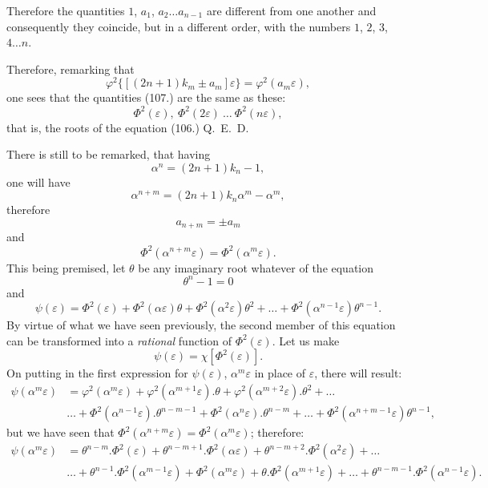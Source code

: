 \documentclass{article}
\begin{document}
Therefore the quantities $1$, $a_{1}$, $a_{2}\ldots a_{n-1}$ are different from one another and consequently they coincide, but in a different order, with the numbers $1$, $2$, $3$, $4\ldots n$.

Therefore, remarking that
\[ \varphi^{2}\{[(2n+1)k_{m}\pm a_{m}]\varepsilon\}=\varphi^{2}(a_{m}\varepsilon), \]
one sees that the quantities (107.) are the same as these:
\[ \Phi^{2}(\varepsilon),\ \Phi^{2}(2\varepsilon)\ \ldots\ \Phi^{2}(n\varepsilon), \]
that is, the roots of the equation (106.) Q.\ E.\ D.

There is still to be remarked, that having
\[ \alpha^{n}=(2n+1)k_{n}-1, \]
one will have
\[ \alpha^{n+m}=(2n+1)k_{n}\alpha^{m}-\alpha^{m}, \]
therefore
\[ a_{n+m}=\pm a_{m} \]
and
\[ \Phi^{2}(\alpha^{n+m}\varepsilon)=\Phi^{2}(\alpha^{m}\varepsilon). \]
This being premised, let $\theta$ be any imaginary root whatever of the equation
\[ \theta^{n}-1=0 \]
and
\[ \psi(\varepsilon)=\Phi^{2}(\varepsilon)+\Phi^{2}(\alpha\varepsilon)\theta+\Phi^{2}(\alpha^{2}\varepsilon)\theta^{2}+\ldots+\Phi^{2}(\alpha^{n-1}\varepsilon)\theta^{n-1}. \tag{108.} \]
By virtue of what we have seen previously, the second member of this equation can be transformed into a \emph{rational} function of $\Phi^{2}(\varepsilon)$. Let us make
\[ \psi(\varepsilon)=\chi[\Phi^{2}(\varepsilon)]. \tag{109.} \]
On putting in the first expression for $\psi(\varepsilon)$, $\alpha^{m}\varepsilon$ in place of $\varepsilon$, there will result:
\[ \begin{aligned}
\psi(\alpha^{m}\varepsilon)&=\varphi^{2}(\alpha^{m}\varepsilon)+\varphi^{2}(\alpha^{m+1}\varepsilon).\theta+\varphi^{2}(\alpha^{m+2}\varepsilon).\theta^{2}+\ldots\\
&\ldots+\Phi^{2}(\alpha^{n-1}\varepsilon).\theta^{n-m-1}+\Phi^{2}(\alpha^{n}\varepsilon).\theta^{n-m}+\ldots+\Phi^{2}(\alpha^{n+m-1}\varepsilon)\theta^{n-1},
\end{aligned} \]
but we have seen that $\Phi^{2}(\alpha^{n+m}\varepsilon)=\Phi^{2}(\alpha^{m}\varepsilon)$; therefore:
\[ \begin{aligned}
\psi(\alpha^{m}\varepsilon)&=\theta^{n-m}.\Phi^{2}(\varepsilon)+\theta^{n-m+1}.\Phi^{2}(\alpha\varepsilon)+\theta^{n-m+2}.\Phi^{2}(\alpha^{2}\varepsilon)+\ldots\\
&\ldots+\theta^{n-1}.\Phi^{2}(\alpha^{m-1}\varepsilon)+\Phi^{2}(\alpha^{m}\varepsilon)+\theta.\Phi^{2}(\alpha^{m+1}\varepsilon)+\ldots+\theta^{n-m-1}.\Phi^{2}(\alpha^{n-1}\varepsilon).
\end{aligned} \]
\end{document}
